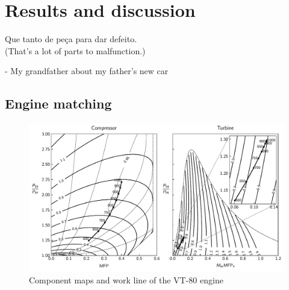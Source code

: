 \documentclass[tcc]{subfiles}
\begin{document}
\chapter{Results and discussion}
\label{sec:results}
\epigraph{Que tanto de peça para dar defeito.\\{\footnotesize (That's a lot of parts to malfunction.)}}{- My grandfather about my father's new car}

\section{Engine matching}
\begin{figure}
    \AddThispageHook{\thispagestyle{empty}}
    \caption{Component maps and work line of the VT-80 engine}
\includegraphics{fig/wline.pdf}
\end{figure}
\end{document}
